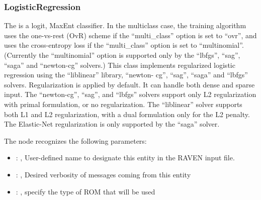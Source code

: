 \subsubsection{LogisticRegression}
  The   is                             a logit, MaxEnt classifier.
  In the multiclass case, the training algorithm uses the one-vs-rest (OvR) scheme
  if the ``multi\_class'' option is set to ``ovr'', and uses the cross-entropy loss if the
  ``multi\_class'' option is set to ``multinomial''. (Currently the ``multinomial'' option
  is supported only by the ``lbfgs'', ``sag'', ``saga'' and ``newton-cg'' solvers.)
  This class implements regularized logistic regression using the ``liblinear'' library, ``newton-
  cg'',                             ``sag'', ``saga'' and ``lbfgs'' solvers. Regularization is
  applied by default. It can handle both dense and sparse input.                             The
  ``newton-cg'', ``sag'', and ``lbfgs'' solvers support only L2 regularization with primal
  formulation,                             or no regularization. The ``liblinear'' solver supports
  both L1 and L2 regularization, with a dual formulation                             only for the L2
  penalty. The Elastic-Net regularization is only supported by the ``saga'' solver.

  The  node recognizes the following parameters:
    \begin{itemize}
      \item {}: ,
        User-defined name to designate this entity in the RAVEN input file.
      \item {}: ,
        Desired verbosity of messages coming from this entity
      \item {}: ,
        specify the type of ROM that will be used
  \end{itemize}

